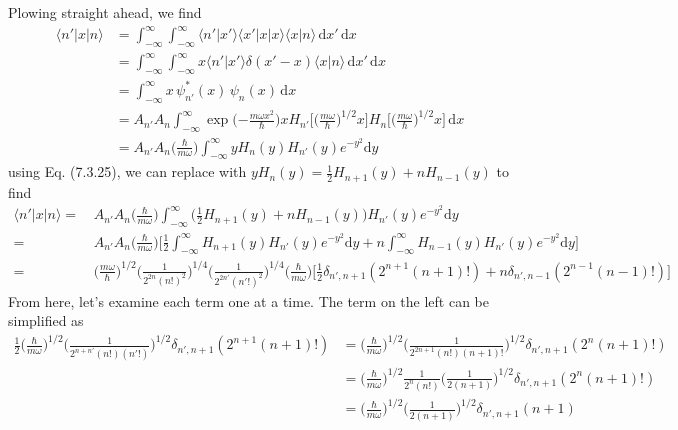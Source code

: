\documentclass[../principles-of-quantum-mechanics.tex]{subfiles}
\begin{document}
\begin{questions}
		\begin{solution}
			Plowing straight ahead, we find
			\begin{align*}
				\langle n'|x|n\rangle &= \int_{-\infty}^{\infty}\int_{-\infty}^{\infty}\langle n'|x'\rangle \langle x'|x|x\rangle \langle x|n\rangle\,\mathrm{d}x'\,\mathrm{d}x \\
				&= \int_{-\infty}^{\infty}\int_{-\infty}^{\infty}x\langle n'|x'\rangle \delta(x' - x) \langle x|n\rangle\,\mathrm{d}x'\,\mathrm{d}x \\
				&= \int_{-\infty}^{\infty}x\,\psi_{n'}^*(x)\,\psi_n(x)\,\mathrm{d}x \\
				&= A_{n'}A_{n}\int_{-\infty}^{\infty}\exp\big({-\tfrac{m\omega x^2}{\hbar}}\big)xH_{n'}\Big[\big(\tfrac{m\omega}{\hbar}\big)^{1/2}x\Big]H_{n}\Big[\big(\tfrac{m\omega}{\hbar}\big)^{1/2}x\Big]\,\mathrm{d}x \\
				&= A_{n'}A_{n}\big(\tfrac{\hbar}{m\omega}\big)\int_{-\infty}^{\infty}yH_n(y)H_{n'}(y)e^{-y^2}\mathrm{d}y
			\end{align*}
			using Eq. (7.3.25), we can replace with $yH_n(y) = \tfrac{1}{2}H_{n+1}(y) + nH_{n-1}(y)$ to find
			\begin{align*}
				\langle n'|x|n\rangle =\,&A_{n'}A_{n}\big(\tfrac{\hbar}{m\omega}\big)\int_{-\infty}^{\infty}\big(\tfrac{1}{2}H_{n+1}(y) + nH_{n-1}(y)\big)H_{n'}(y)e^{-y^2}\mathrm{d}y \\
				=\, &A_{n'}A_n\big(\tfrac{\hbar}{m\omega}\big)\Big[\tfrac{1}{2}\int_{-\infty}^{\infty}H_{n+1}(y)H_{n'}(y)e^{-y^2}\mathrm{d}y + n\int_{-\infty}^{\infty}H_{n-1}(y)H_{n'}(y)e^{-y^2}\mathrm{d}y\Big] \\
				=\, &\big(\tfrac{m\omega}{\hbar}\big)^{1/2}\big(\tfrac{1}{2^{2n}(n!)^2}\big)^{1/4}\big(\tfrac{1}{2^{2n'}(n'!)^2}\big)^{1/4}\big(\tfrac{\hbar}{m\omega}\big)\big[\tfrac{1}{2}\delta_{n', n+1}(2^{n+1}(n+1)!)  + n\delta_{n', n-1}(2^{n-1}(n-1)!)\big]
			\end{align*}
			From here, let's examine each term one at a time. The term on the left can be simplified as
			\begin{align*}
				\tfrac{1}{2}\big(\tfrac{\hbar}{m\omega}\big)^{1/2}\big(\tfrac{1}{2^{n + n'}(n!)(n'!)}\big)^{1/2}\delta_{n', n+1}(2^{n+1}(n+1)!) &= \big(\tfrac{\hbar}{m\omega}\big)^{1/2}\big(\tfrac{1}{2^{2n+1}(n!)(n+1)!}\big)^{1/2}\delta_{n', n+1}(2^{n}(n+1)!) \\
				&= \big(\tfrac{\hbar}{m\omega}\big)^{1/2}\tfrac{1}{2^n(n!)}\big(\tfrac{1}{2(n+1)}\big)^{1/2}\delta_{n',n+1}(2^n(n+1)!) \\
				&= \big(\tfrac{\hbar}{m\omega}\big)^{1/2}\big(\tfrac{1}{2(n+1)}\big)^{1/2}\delta_{n',n+1}(n+1) \\

\end{align*}
\end{solution}
\end{questions}
\end{document}
